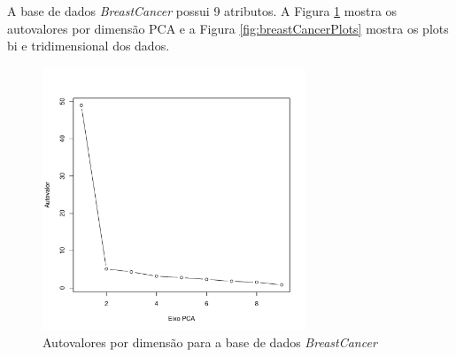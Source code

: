 \documentclass[a4paper]{article}
\begin{document}
A base de dados \textit{BreastCancer} possui 9 atributos. A Figura \ref{fig:breastCancerAuto} mostra os autovalores por dimensão PCA e a Figura \ref{fig:breastCancerPlots} mostra os plots bi e tridimensional dos dados.

\begin{figure}[H]
	\centering
	\includegraphics[page=1,width=0.7\textwidth]{../breastCancer.pdf}
	\caption{Autovalores por dimensão para a base de dados \textit{BreastCancer}}
	\label{fig:breastCancerAuto}
\end{figure}
\end{document}
